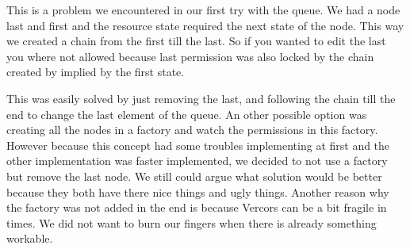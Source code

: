This is a problem we encountered in our first try with the queue. We had a node last and first and the resource state required the next state of the node. This way we created a chain from the first till the last. So if you wanted to edit the last you where not allowed because last permission was also locked by the chain created by implied by the first state.

This was easily solved by just removing the last, and following the chain till the end to change the last element of the queue. An other possible option was creating all the nodes in a factory and watch the permissions in this factory. However because this concept had some troubles implementing at first and the other implementation was faster implemented, we decided to not use a factory but remove the last node. We still could argue what solution would be better because they both have there nice things and ugly things. Another reason why the factory was not added in the end is because Vercors can be a bit fragile in times. We did not want to burn our fingers when there is already something workable.
